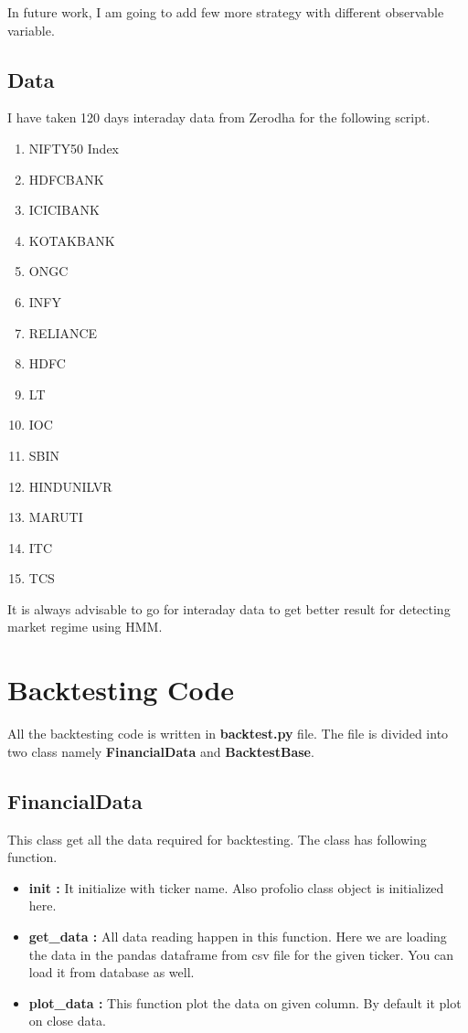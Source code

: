 \documentclass{report}
\begin{document}
In future work, I am going to add few more strategy with different observable variable.

\section{Data}

I have taken 120 days interaday data from Zerodha for the following script.
\begin{enumerate}
  	\item NIFTY50 Index
  	\item HDFCBANK
	\item ICICIBANK
	\item KOTAKBANK
	\item ONGC
	\item INFY
	\item RELIANCE
	\item HDFC
	\item LT
	\item IOC
	\item SBIN
	\item HINDUNILVR
	\item MARUTI
	\item ITC
	\item TCS
\end{enumerate}
It is always advisable to go for interaday data to get better result for detecting market regime using HMM.


\chapter{Backtesting Code}
All the backtesting code is written in \textbf{backtest.py} file. The file is divided into two class namely \textbf{FinancialData} and \textbf{BacktestBase}.

\section{FinancialData}
This class get all the data required for backtesting.
The class has following function.
\begin{itemize}
  \item \textbf{init :}
  It initialize with ticker name. Also profolio class object is initialized here.
  \item \textbf{get\_data :}
  All data reading happen in this function.
  Here we are loading the data in the pandas dataframe from csv file for the given ticker. You can load it from database 
  as well.
  \item \textbf{plot\_data :}
  This function plot the data on given column. By default it plot on close data.
\end{itemize}
\end{document}
